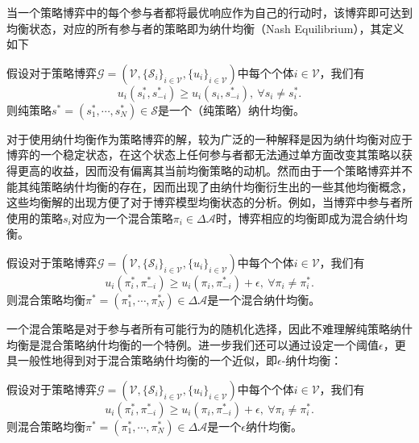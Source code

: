 当一个策略博弈中的每个参与者都将最优响应作为自己的行动时，该博弈即可达到均衡状态，对应的所有参与者的策略即为纳什均衡（Nash Equilibrium）\cite{Nash1951}，其定义如下
\begin{df}[纳什均衡]
假设对于策略博弈$\mathcal{G}=(\mathcal{V},\{\mathcal{S}_i\}_{i\in\mathcal{V}},\{u_i\}_{i\in\mathcal{V}})$中每个个体$i\in\mathcal{V}$，我们有
\begin{equation}\label{}
u_{i}(s_{i}^*,s_{-i}^*)\ge u_{i}(s_{i},s_{-i}^*),~\forall s_i\ne s_i^*.
\end{equation}
则纯策略$s^*=(s_{1}^*,\cdots,s_{N}^*)\in\mathcal{S}$是一个（纯策略）纳什均衡。
\end{df}
对于使用纳什均衡作为策略博弈的解，较为广泛的一种解释是因为纳什均衡对应于博弈的一个稳定状态，在这个状态上任何参与者都无法通过单方面改变其策略以获得更高的收益，因而没有偏离其当前均衡策略的动机。然而由于一个策略博弈并不能其纯策略纳什均衡的存在，因而出现了由纳什均衡衍生出的一些其他均衡概念，这些均衡解的出现方便了对于博弈模型均衡状态的分析。例如，当博弈中参与者所使用的策略$s_i$对应为一个混合策略$\pi_i\in\Delta\mathcal{A}$时，博弈相应的均衡即成为混合纳什均衡。
\begin{df}[混合纳什均衡]
假设对于策略博弈$\mathcal{G}=(\mathcal{V},\{\mathcal{S}_i\}_{i\in\mathcal{V}},\{u_i\}_{i\in\mathcal{V}})$中每个个体$i\in\mathcal{V}$，我们有
\begin{equation}\label{}
u_{i}(\pi_{i}^*,\pi_{-i}^*)\ge u_{i}(\pi_{i},\pi_{-i}^*) + \epsilon,~\forall \pi_i\ne\pi_i^*.
\end{equation}
则混合策略均衡$\pi^*=(\pi_{1}^*,\cdots,\pi_{N}^*)\in\Delta\mathcal{A}$是一个混合纳什均衡。
\end{df}

一个混合策略是对于参与者所有可能行为的随机化选择，因此不难理解纯策略纳什均衡是混合策略纳什均衡的一个特例。进一步我们还可以通过设定一个阈值$\epsilon$，更具一般性地得到对于混合策略纳什均衡的一个近似，即$\epsilon$-纳什均衡：
\begin{df}
假设对于策略博弈$\mathcal{G}=(\mathcal{V},\{\mathcal{S}_i\}_{i\in\mathcal{V}},\{u_i\}_{i\in\mathcal{V}})$中每个个体$i\in\mathcal{V}$，我们有
\begin{equation}\label{}
u_{i}(\pi_{i}^*,\pi_{-i}^*)\ge u_{i}(\pi_{i},\pi_{-i}^*) + \epsilon,~\forall \pi_i\ne\pi_i^*.
\end{equation}
则混合策略均衡$\pi^*=(\pi_{1}^*,\cdots,\pi_{N}^*)\in\Delta\mathcal{A}$是一个$\epsilon$纳什均衡。
\end{df}

